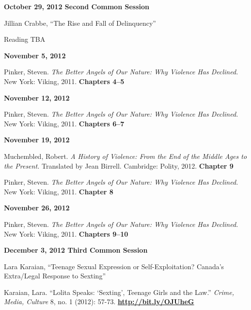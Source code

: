 \documentclass[12pt]{article}
\begin{document}
\textbf{October 29, 2012 \hspace{.125in} Second Common Session}

\begin{hangparas}{.5in}{1}
Jillian Crabbe, ``The Rise and Fall of Delinquency''

Reading TBA
\end{hangparas}

\textbf{November 5, 2012}

\begin{hangparas}{.5in}{1}
Pinker, Steven. \textit{The Better Angels of Our Nature: Why Violence Has Declined.} New York: Viking, 2011. \textbf{Chapters 4--5}
\end{hangparas}

\textbf{November 12, 2012}

\begin{hangparas}{.5in}{1}
Pinker, Steven. \textit{The Better Angels of Our Nature: Why Violence Has Declined.} New York: Viking, 2011. \textbf{Chapters 6--7}
\end{hangparas}

\textbf{November 19, 2012}

\begin{hangparas}{.5in}{1}
Muchembled, Robert. \textit{A History of Violence: From the End of the Middle Ages to the Present.} Translated by Jean Birrell. Cambridge: Polity, 2012. \textbf{Chapter 9}

Pinker, Steven. \textit{The Better Angels of Our Nature: Why Violence Has Declined.} New York: Viking, 2011. \textbf{Chapter 8}
\end{hangparas}

\textbf{November 26, 2012}

\begin{hangparas}{.5in}{1}
Pinker, Steven. \textit{The Better Angels of Our Nature: Why Violence Has Declined.} New York: Viking, 2011. \textbf{Chapters 9--10}
\end{hangparas}

\textbf{December 3, 2012 \hspace{.125in} Third Common Session}

Lara Karaian, ``Teenage Sexual Expression or Self-Exploitation? Canada's Extra/Legal Response to Sexting''

\begin{hangparas}{.5in}{1}
Karaian, Lara. ``Lolita Speaks: `Sexting', Teenage Girls and the Law.'' \textit{Crime, Media, Culture} 8, no. 1 (2012): 57-73. \href{http://bit.ly/OJUheG}{\textbf{http://bit.ly/OJUheG}}
\end{hangparas}
\end{document}
